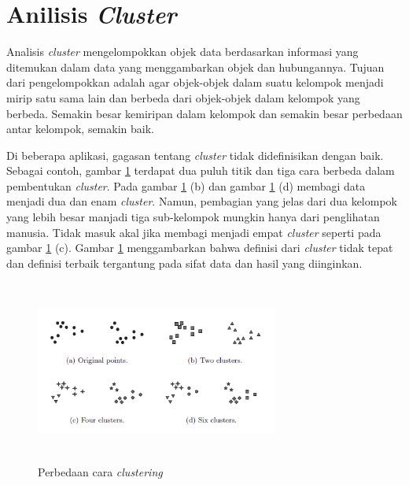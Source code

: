 
\section{Anilisis \textit{Cluster}}
\label{sec:cluster}

Analisis \textit{cluster} \cite{buku:data:mining} mengelompokkan objek data berdasarkan informasi yang ditemukan dalam data yang menggambarkan objek dan hubungannya. Tujuan dari pengelompokkan adalah agar objek-objek dalam suatu kelompok menjadi mirip satu sama lain dan berbeda dari objek-objek dalam kelompok yang berbeda. Semakin besar kemiripan dalam kelompok dan semakin besar perbedaan antar kelompok, semakin baik.

Di beberapa aplikasi, gagasan tentang \textit{cluster} tidak didefinisikan dengan baik. Sebagai contoh, gambar \ref{fig:perbedaan cara clustering} terdapat dua puluh titik dan tiga cara berbeda dalam pembentukan \textit{cluster}. Pada gambar \ref{fig:perbedaan cara clustering} (b)  dan gambar \ref{fig:perbedaan cara clustering} (d) membagi data menjadi dua dan enam \textit{cluster}. Namun, pembagian yang jelas dari dua kelompok yang lebih besar manjadi tiga sub-kelompok mungkin hanya dari penglihatan manusia. Tidak masuk akal jika membagi menjadi empat \textit{cluster} seperti pada gambar \ref{fig:perbedaan cara clustering} (c). Gambar \ref{fig:perbedaan cara clustering} menggambarkan bahwa definisi dari \textit{cluster} tidak tepat dan definisi terbaik tergantung pada sifat data dan hasil yang diinginkan.

\begin{figure}[H]
    \centering
    \includegraphics[width= 8cm, height= 6cm]{doc/DokumenSkripsi/Gambar/gambar21.PNG}
    \caption{Perbedaan cara \textit{clustering}}
    \label{fig:perbedaan cara clustering}
\end{figure}

